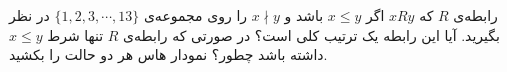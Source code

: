 \EXERCISE
رابطه‌ی
$R$
که
$xRy$
اگر
$x \leq y$
باشد و
$x \nmid y$
را روی مجموعه‌ی
$\{1, 2, 3, \cdots, 13\}$
در نظر بگیرید. آیا این رابطه یک ترتیب کلی است؟ در صورتی که رابطه‌ی
$R$
تنها شرط
$x \leq y$
داشته باشد چطور؟ نمودار هاس هر دو حالت را بکشید.